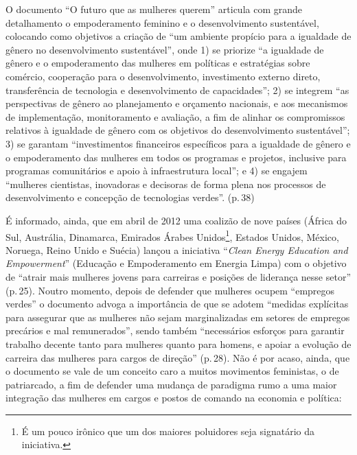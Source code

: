 O documento ``O futuro que as mulheres querem'' articula com grande
detalhamento o empoderamento feminino e o desenvolvimento sustentável,
colocando como objetivos a criação de ``um ambiente propício para a
igualdade de gênero no desenvolvimento sustentável'', onde 1) se
priorize ``a igualdade de gênero e o empoderamento das mulheres em
políticas e estratégias sobre comércio, cooperação para o
desenvolvimento, investimento externo direto, transferência de
tecnologia e desenvolvimento de capacidades''; 2) se integrem ``as
perspectivas de gênero ao planejamento e orçamento nacionais, e aos
mecanismos de implementação, monitoramento e avaliação, a fim de alinhar
os compromissos relativos à igualdade de gênero com os objetivos do
desenvolvimento sustentável''; 3) se garantam ``investimentos
financeiros específicos para a igualdade de gênero e o empoderamento das
mulheres em todos os programas e projetos, inclusive para programas
comunitários e apoio à infraestrutura local''; e 4) se engajem
``mulheres cientistas, inovadoras e decisoras de forma plena nos
processos de desenvolvimento e concepção de tecnologias verdes''. (p.\,38)

É informado, ainda, que em abril de 2012 uma coalizão de nove países
(África do Sul, Austrália, Dinamarca, Emirados Árabes Unidos\footnote{É
  um pouco irônico que um dos maiores poluidores seja signatário da
  iniciativa.}, Estados Unidos, México, Noruega, Reino Unido e Suécia)
lançou a iniciativa ``\emph{Clean Energy Education and Empowerment}''
(Educação e Empoderamento em Energia Limpa) com o objetivo de ``atrair
mais mulheres jovens para carreiras e posições de liderança nesse
setor'' (p.\,25). Noutro momento, depois de defender que mulheres ocupem
``empregos verdes'' o documento advoga a importância de que se adotem
``medidas explícitas para assegurar que as mulheres não sejam
marginalizadas em setores de empregos precários e mal remunerados'',
sendo também ``necessários esforços para garantir trabalho decente tanto
para mulheres quanto para homens, e apoiar a evolução de carreira das
mulheres para cargos de direção'' (p.\,28). Não é por acaso, ainda, que o
documento se vale de um conceito caro a muitos movimentos feministas, o
de patriarcado, a fim de defender uma mudança de paradigma rumo a uma
maior integração das mulheres em cargos e postos de comando na economia
e política:

